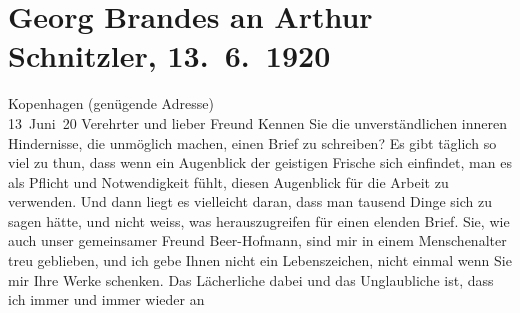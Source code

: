 

               \section[Georg Brandes an Arthur Schnitzler, 13. 6. 1920]{ Georg Brandes an Arthur Schnitzler, 13. 6. 1920}\nopagebreak{}\rehead{ }\begin{ledgroupsized}[t]{13cm}\normalsize\beginnumbering{} \toendnotes[C]{\smallbreak\pagebreak[2]} 
\toendnotes[C]{\smallbreak}\pstart
           \raggedleft{}{\pb}Kopenhagen (genügende Adresse){\\}13 Juni 20\pend
           \pstart{}Verehrter und lieber Freund \pend\pstart
           Kennen Sie die unverständlichen inneren Hindernisse, die \label{T_L02342_1v}\label{T_L02342_1h} unmöglich machen,
               einen Brief zu schreiben? Es gibt täglich so viel zu thun, dass wenn ein Augenblick
               der geistigen Frische sich einfindet, man es als Pflicht und Notwendigkeit fühlt,
               diesen Augenblick für die Arbeit zu verwenden. Und dann liegt es vielleicht daran,
               dass man tausend Dinge sich zu sagen hätte, und nicht weiss, was herauszugreifen für
               einen elenden Brief. Sie, wie auch unser gemeinsamer Freund Beer-Hofmann, sind mir in einem Menschenalter treu geblieben,
               und ich gebe Ihnen nicht ein Lebenszeichen, nicht einmal wenn Sie mir Ihre Werke
               schenken. Das Lächerliche dabei und das Unglaubliche ist, {\pb}dass ich immer und immer wieder an

\end{ledgroupsized}
